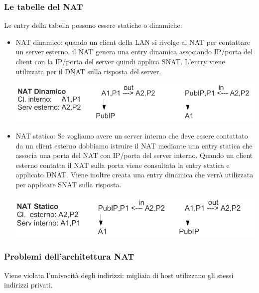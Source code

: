         \subsubsection{Le tabelle del NAT}
            Le entry della tabella possono essere statiche o dinamiche:
            \begin{itemize}
                \item NAT dinamico: quando un client della LAN si rivolge al NAT per contattare un server esterno, il NAT genera una entry dinamica associando IP/porta del client con la IP/porta del server quindi applica SNAT. L'entry viene utilizzata per il DNAT sulla risposta del server.
                
                \begin{center}
                    \includegraphics[scale=0.35]{chapters/4/assets/schema_h.png}
                \end{center}

                \item NAT statico: Se vogliamo avere un server interno che deve essere contattato da un client esterno dobbiamo istruire il NAT mediante una entry statica che associa una porta del NAT con IP/porta del server interno. Quando un client esterno contatta il NAT sulla porta viene consultata la entry statica e applicato DNAT. Viene inoltre creata una entry dinamica che verrà utilizzata per applicare SNAT sulla risposta.
                
                \begin{center}
                    \includegraphics[scale=0.35]{chapters/4/assets/schema_i.png}
                \end{center}
            \end{itemize}

        \subsubsection{Problemi dell'architettura NAT}
            Viene violata l'univocità degli indirizzi: migliaia di host utilizzano gli stessi indirizzi privati.
        
